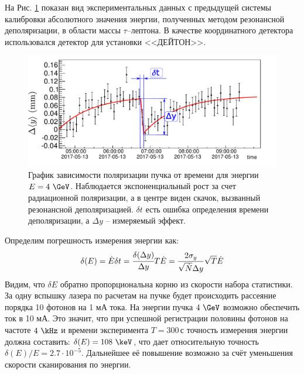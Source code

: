 На Рис. \ref{fig:RD_effect_graph} показан вид экспериментальных данных с предыдущей системы калибровки абсолютного значения энергии, полученных методом резонансной деполяризации, в области массы $\tau$--лептона. В качестве координатного детектора использовался детектор для установки <<ДЕЙТОН>>.
\begin{figure}[H]
	\begin{center}
		\includegraphics[width = 16cm]{img/rd_exp.pdf}
		\caption{График зависимости поляризации пучка от времени для энергии $E = 4~\GeV$. Наблюдается экспоненциальный рост за счет радиационной поляризации, а в центре виден скачок, вызванный резонансной деполяризацией. $\delta t$ есть ошибка определения времени деполяризации, а $\Delta y$ -- измеряемый эффект.}
		\label{fig:RD_effect_graph}
	\end{center}
\end{figure}
\vspace{-20pt}
\noindent Определим погрешность измерения энергии как: 
\begin{equation}
\delta(E)= \dot{E} \delta t = \cfrac{\delta(\Delta y)}{\Delta y}T\dot{E} = \frac{2 \sigma_y}{\sqrt{\dot{N}} \Delta y}\sqrt{T}\dot{E}  
\end{equation}
Видим, что $\delta E$ обратно пропорциональна корню из скорости набора статистики. За одну вспышку лазера по расчетам на пучке будет происходить рассеяние порядка 10 фотонов на 1 мА тока. На энергии пучка $4~\GeV$ возможно обеспечить ток в 10 мА. Это значит, что при успешной регистрации половины фотонов на частоте $4~\kHz$ и времени эксперимента $ T = 300$\,с точность измерения энергии должна составить: $\delta(E)= 108~\keV$, что дает относительную точность $\delta(E)/E= 2.7\cdot10^{-5}$. Дальнейшее её повышение возможно за счёт уменьшения скорости сканирования по энергии.
 
